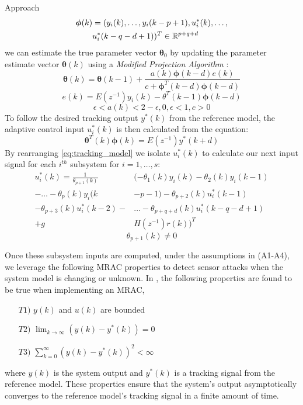 \begin{section}{Approach}
	\begin{equation}
	\begin{split}
	\bm{\phi}(k)&=(y_i(k), \dots ,y_i(k-p+1),u^*_i(k), \dots , \\
	& u^*_i(k-q-d+1))^T \in \mathbb{R}^{p+q+d}
	\end{split}
	\end{equation}
we can estimate the true parameter vector $\bm{\theta}_0$ by updating the parameter estimate vector $\bm{\theta}(k)$ using a \textit{Modified Projection Algorithm} \cite{tao2003adaptive}:
	\begin{equation}
	\label{eq:Modified_Proj_Algorithm}
	\bm{\theta}(k)=\bm{\theta}(k-1)+\frac{a(k)\bm{\phi}(k-d)e(k)}{c+\bm{\phi}^T(k-d)\bm{\phi}(k-d)}
	\end{equation}
	\begin{equation}
	e(k)=E(z^{-1})y_i(k)-\theta^T(k-1)\bm{\phi}(k-d)
	\end{equation}
	\begin{equation}
	\epsilon<a(k)<2-\epsilon, 0,\epsilon<1, c>0 \nonumber
	\end{equation}
To follow the desired tracking output $y^*(k)$ from the reference model, the adaptive control input $u^*_i(k)$ is then calculated from the equation:
    \begin{equation}
    \label{eq:tracking_model}
	\bm{\theta}^T(k)\bm{\phi}(k)=E(z^{-1})y^*(k+d)
	\end{equation}
By rearranging \eqref{eq:tracking_model} we isolate $u^*_i(k)$ to calculate our next input signal for each $i^{th}$ subsystem for $i=1,\dots,s$:
	\begin{align}
	\label{eq:End}
	u^*_i(k)=\frac{1}{\theta_{p+1}(k)}&(-\theta_1(k)y_i(k)-\theta_2(k)y_i(k-1)  \nonumber \\
    -\dots-\theta_p(k)y_i(k&-p-1)-\theta_{p+2}(k)u^*_i(k-1)  \\
	-\theta_{p+3}(k)u^*_i(k-2)-& \dots - \theta_{p+q+d}(k)u^*_i(k-q-d+1) \nonumber \\
	+g&H(z^{-1})r(k))^T \nonumber
	\end{align}
    \begin{equation}
	\theta_{p+1}(k)\neq0 \nonumber
	\end{equation}

Once these subsystem inputs are computed, under the assumptions in (A1-A4), we leverage the following MRAC properties to detect sensor attacks when the system model is changing or unknown. In \cite{tao2003adaptive}, the following properties are found to be true when implementing an MRAC,
	\begin{enumerate}%
	\label{assumtions_ensure}
	\item[$T1)$] $y(k)$ and $u(k)$ are bounded 
	\item[$T2)$] $\lim_{k\to\infty}(y(k)-y^*(k))=0$
	\label{Truth2}
	\item[$T3)$] $\sum_{k=0}^\infty(y(k)-y^*(k))^2<\infty$
	\end{enumerate}
where $y(k)$ is the system output and $y^*(k)$ is a tracking signal from the reference model. These properties ensure that the system's output asymptotically converges to the reference model's tracking signal in a finite amount of time. 



\end{section}
